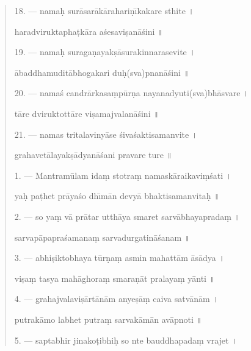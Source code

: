 \documentclass[a4paper, 11pt, oneside, french]{article}
\begin{document}
\begin{quotation}
\bigskip

18. --- nama\d{h} sur\={a}sar\={a}k\={a}rahari\d{n}\={\i}kakare sthite \texthindi{।}

haradviruktapha\d{t}k\={a}ra a\'{s}esavi\d{s}an\={a}\'{s}ini \texthindi{॥}

\bigskip

19. --- nama\d{h} suraga\d{n}ayak\d{s}\={a}surakinnarasevite \texthindi{।}

\={a}baddhamudit\={a}bhogakari du\d{h}(sva)pnan\={a}\'{s}ini \texthindi{॥}

\bigskip

20. --- nama\'{s} candr\={a}rkasa\d{m}p\={u}r\d{n}a nayanadyuti(sva)bh\={a}svare \texthindi{।}

t\={a}re dviruktott\={a}re vi\d{s}amajvalan\={a}\'{s}ini \texthindi{॥}

\bigskip

21. --- namas tritalaviny\={a}se \'{s}iva\'{s}aktisamanvite \texthindi{।}

grahavet\={a}layak\d{s}\={a}dyan\={a}\'{s}ani pravare ture \texthindi{॥}

\bigskip

\bigskip

1. --- Mantram\={u}lam ida\d{m} stotra\d{m} namask\={a}raikavi\d{m}\'{s}ati \texthindi{।}

ya\d{h} pa\d{t}het pr\={a}ya\'{s}o dh\={\i}m\={a}n devy\={a} bhaktisamanvita\d{h} \texthindi{॥}

\bigskip

2. --- so ya\d{m} v\={a} pr\={a}tar utth\={a}ya smaret sarv\={a}bhayaprada\d{m} \texthindi{।}

sarvap\={a}papra\'{s}amana\d{m} sarvadurgatin\={a}\'{s}anam \texthindi{॥}

\bigskip

3. --- abhi\d{s}iktobhaya t\={u}r\d{n}a\d{m} asmin mahatt\={a}m \={a}s\={a}dya \texthindi{।}

vi\d{s}a\d{m} tasya mah\={a}ghora\d{m} smara\d{n}\={a}t pralaya\d{m} y\={a}nti \texthindi{॥}

\bigskip

4. --- grahajvalavi\d{s}\={a}rt\={a}n\={a}m anye\d{s}\={a}\d{m} caiva satv\={a}n\={a}m \texthindi{।}

putrak\={a}mo labhet putra\d{m} sarvak\={a}m\={a}n av\={a}pnoti \texthindi{॥}

\bigskip

5. --- saptabhir jinako\d{t}ibhi\d{h} so nte bauddhapada\d{m} vrajet \texthindi{।}


\end{quotation}
\end{document}
